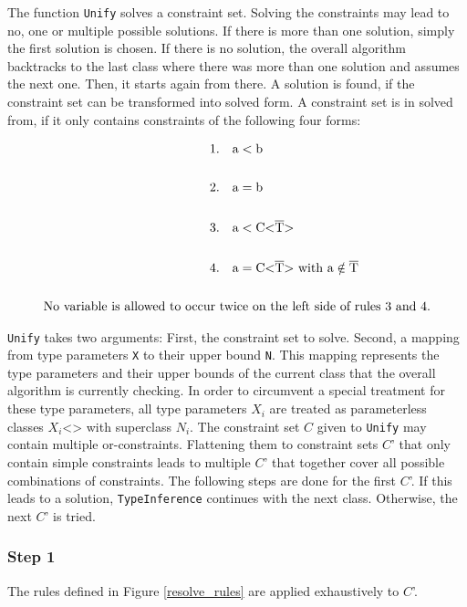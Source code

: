 The function \verb|Unify| solves a constraint set. Solving the constraints may lead to no, one or multiple possible solutions. If there is more than one solution, simply the first solution is chosen. If there is no solution, the overall algorithm backtracks to the last class where there was more than one solution and assumes the next one. Then, it starts again from there.
A solution is found, if the constraint set can be transformed into solved form. A constraint set is in solved from, if it only contains constraints of the following four forms:

\begin{align*}
    1.& \quad \text{a} < \text{b}\\
    \\
    2.& \quad \text{a} = \text{b}\\
    \\
    3.& \quad \text{a} < \text{C<} \ot{T} \text{>}\\
    \\
    4.& \quad \text{a} = \text{C<} \ot{T} \text{>} \ \text{with a} \notin \ot{T}\\
    \\
    \text{No variable is allowed to occur } & \text{twice on the left side of rules 3 and 4.}
\end{align*}

\verb|Unify| takes two arguments: First, the constraint set to solve. Second, a mapping from type parameters \verb|X| to their upper bound \verb|N|. This mapping represents the type parameters and their upper bounds of the current class that the overall algorithm is currently checking.
In order to circumvent a special treatment for these type parameters, all type parameters $X_i$ are treated as parameterless classes $X_i$<> with superclass $N_i$.
The constraint set $C$ given to \verb|Unify| may contain multiple or-constraints. Flattening them to constraint sets $C$' that only contain simple constraints leads to multiple $C$' that together cover all possible combinations of constraints.
The following steps are done for the first $C$'. If this leads to a solution, \verb|TypeInference| continues with the next class. Otherwise, the next $C$' is tried.

\subsubsection{Step 1}
The rules defined in Figure \ref{resolve_rules} are applied exhaustively to $C$'.

